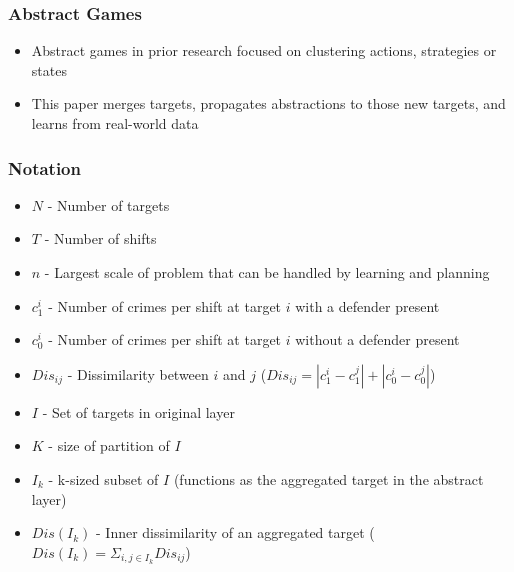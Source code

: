 \documentclass{beamer}
\begin{document}
	\begin{frame}
		\frametitle{Abstract Games}
		\begin{itemize}
			\item Abstract games in prior research focused on clustering actions, strategies or states
			\item This paper merges targets, propagates abstractions to those new targets, and learns from real-world data
		\end{itemize}
	\end{frame}

	\begin{frame}
		\frametitle{Notation}
		\begin{itemize}
			\item $ N $ - Number of targets \\
			\item $ T $ - Number of shifts \\
			\item $ n $ - Largest scale of problem that can be handled by learning and planning
			\item $ c^{i}_{1} $ - Number of crimes per shift at target $i$ with a defender present \\
			\item $ c^{i}_{0} $ - Number of crimes per shift at target $i$ without a defender present \\
			\item $ Dis_{ij} $ - Dissimilarity between $i$ and $j$ ($Dis_{ij} = |c^{i}_{1} - c^{j}_{1}| + |c^{i}_{0} - c^{j}_{0}|$) \\
			\item $ I $ - Set of targets in original layer \\
			\item $ K $ - size of partition of $I$ \\ 
			\item $ I_{k} $ - k-sized subset of $I$ (functions as the aggregated target in the abstract layer) \\
			\item $ Dis(I_{k}) $ - Inner dissimilarity of an aggregated target ($Dis(I_{k}) = \Sigma_{i,j \in I_{k}} Dis_{ij}$) \\
		\end{itemize}
	\end{frame}
\end{document}
